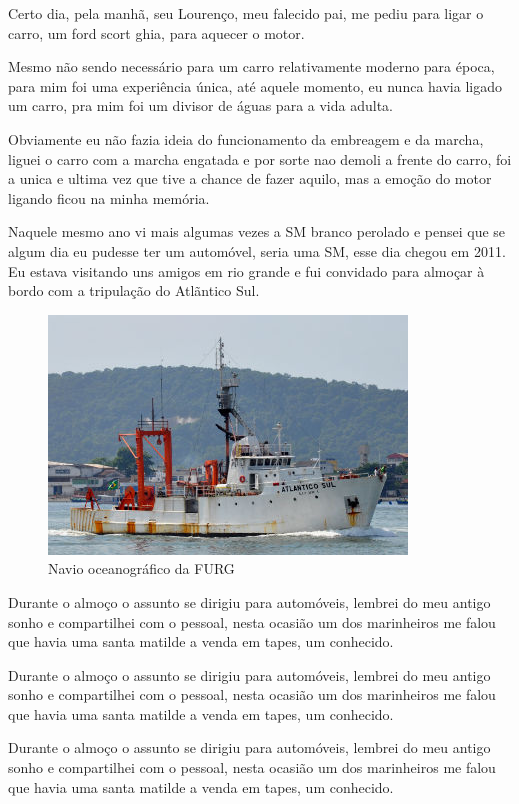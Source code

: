 \documentclass[a4paper]{report}
\begin{document}
Certo dia, pela manh\~a, seu Louren\c{c}o, meu falecido pai, me pediu para ligar o carro, um ford scort ghia, para aquecer o motor.

Mesmo n\~ao sendo necess\'ario para um carro relativamente moderno para \'epoca, para mim foi uma experi\^encia \'unica,
at\'e aquele momento, eu nunca havia ligado um carro, pra mim foi um divisor de \'aguas para a vida adulta.

Obviamente eu n\~ao fazia ideia do funcionamento da embreagem e da marcha, liguei o carro com a marcha engatada e por sorte
nao demoli a frente do carro, foi a unica e ultima vez que tive a chance de fazer aquilo, mas a emo\c{c}\~ao do motor ligando ficou
na minha mem\'oria. 

Naquele mesmo ano vi mais algumas vezes a SM branco perolado e pensei que se algum dia eu pudesse ter um
autom\'ovel, seria uma SM, esse dia chegou em 2011.
\clearpage
Eu estava visitando uns amigos em rio grande e fui convidado para almo\c{c}ar \`a bordo com a tripula\c{c}\~ao do Atl\~antico Sul.

\begin{figure}[!htb]
\centering
\includegraphics{atsul}
\caption{Navio oceanogr\'afico da FURG}
\label{at_sul}
\end{figure}

Durante o almo\c{c}o o assunto se dirigiu para autom\'oveis, lembrei do meu antigo sonho e compartilhei com o pessoal, nesta ocasi\~ao um dos marinheiros
me falou que havia uma santa matilde a venda em tapes, um conhecido.


Durante o almo\c{c}o o assunto se dirigiu para autom\'oveis, lembrei do meu antigo sonho e compartilhei com o pessoal, nesta ocasi\~ao um dos marinheiros
me falou que havia uma santa matilde a venda em tapes, um conhecido.

Durante o almo\c{c}o o assunto se dirigiu para autom\'oveis, lembrei do meu antigo sonho e compartilhei com o pessoal, nesta ocasi\~ao um dos marinheiros
me falou que havia uma santa matilde a venda em tapes, um conhecido.
\end{document}
